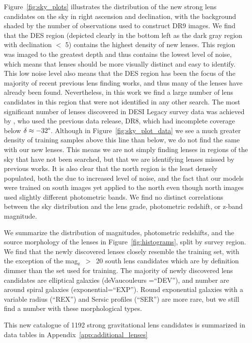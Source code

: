 \documentclass{aastex631}
\newcommand{\zmag}{mag$_{\mathrm{z}}$}
\begin{document}
Figure~\ref{fig:sky_plots} illustrates the distribution of the new strong lens candidates on the sky in right ascension and declination, with the background shaded by the number of observations used to construct DR9 images. We find that the DES region (depicted clearly in the bottom left as the dark gray region with declination $<$ 5\degree) contains the highest density of new lenses. This region was imaged to the greatest depth and thus contains the lowest level of noise, which means that lenses should be more visually distinct and easy to identify. This low noise level also means that the DES region has been the focus of the majority of recent previous lens finding works, and thus many of the lenses have already been found. Nevertheless, in this work we find a large number of lens candidates in this region that were not identified in any other search. The most significant number of lenses discovered in DESI Legacy survey data was achieved by \citep{HuangII}, who used the previous data release, DR8, which had incomplete coverage below $\delta \approx -32\degree$. Although in Figure~\ref{fig:sky_plot_data} we see a much greater density of training samples above this line than below, we do not find the same with our new lenses. This means we are not simply finding lenses in regions of the sky that have not been searched, but that we are identifying lenses missed by previous works. It is also clear that the north region is the least densely populated, both the due to increased level of noise, and the fact that our models were trained on south images yet applied to the north even though north images used slightly different photometric bands. We find no distinct correlations between the sky distribution and the lens grade, photometric redshift, or z-band magnitude. 

We summarize the distribution of magnitudes, photometric redshifts, and the source morphology of the lenses in Figure~\ref{fig:histograms}, split by survey region. We find that the newly discovered lenses closely resemble the training set, with the exception of the \zmag~$>$~20 south lens candidates which are by definition dimmer than the set used for training. The majority of newly discovered lens candidates are elliptical galaxies (deVaucouleurs =``DEV''), and number are around spiral galaxies (exponential=``EXP''). Round exponential galaxies with a variable radius (``REX'') and Sersic profiles (``SER'') are more rare, but we still find a number with these morphological types.

This new catalogue of 1192 strong gravitational lens candidates is summarized in data tables in Appendix~\ref{app:additional_lenses} 
\end{document}
